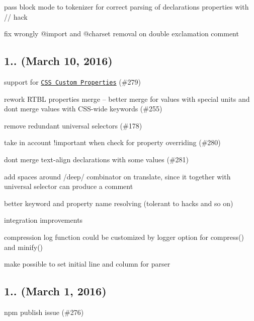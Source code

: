 \begin{DoxyItemize}
\item pass block mode to tokenizer for correct parsing of declarations properties with {\ttfamily //} hack
\item fix wrongly {\ttfamily @import} and {\ttfamily @charset} removal on double exclamation comment
\end{DoxyItemize}

\subsection*{1.. (March 10, 2016)}


\begin{DoxyItemize}
\item support for \href{https://www.w3.org/TR/css-variables/}{\tt C\+SS Custom Properties} (\#279)
\item rework R\+T\+BL properties merge – better merge for values with special units and don\textquotesingle{}t merge values with C\+S\+S-\/wide keywords (\#255)
\item remove redundant universal selectors (\#178)
\item take in account {\ttfamily !important} when check for property overriding (\#280)
\item don\textquotesingle{}t merge {\ttfamily text-\/align} declarations with some values (\#281)
\item add spaces around {\ttfamily /deep/} combinator on translate, since it together with universal selector can produce a comment
\item better keyword and property name resolving (tolerant to hacks and so on)
\item integration improvements
\begin{DoxyItemize}
\item compression log function could be customized by {\ttfamily logger} option for {\ttfamily compress()} and {\ttfamily minify()}
\item make possible to set initial line and column for parser
\end{DoxyItemize}
\end{DoxyItemize}

\subsection*{1.. (March 1, 2016)}


\begin{DoxyItemize}
\item {\ttfamily npm} publish issue (\#276)
\end{DoxyItemize}

